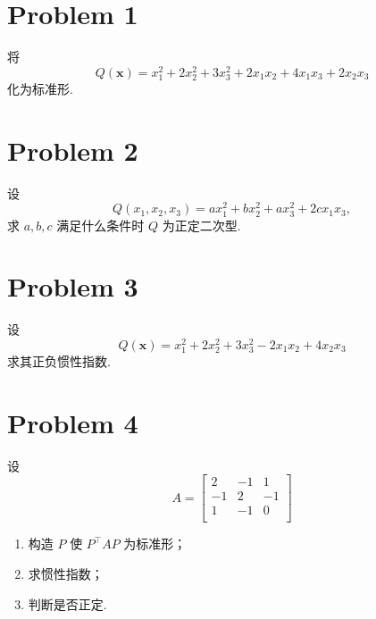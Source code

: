 \section*{Problem 1}

将
\[
Q\left(\boldsymbol{x}\right) = x_1^2 + 2x_2^2 + 3x_3^2 + 2x_1x_2 + 4x_1x_3 + 2x_2x_3
\]
化为标准形.

\section*{Problem 2}

设
\[
Q\left(x_1, x_2, x_3\right) = ax_1^2 + bx_2^2 + ax_3^2 + 2cx_1x_3,
\]
求 $a, b, c$ 满足什么条件时 $Q$ 为正定二次型.

\section*{Problem 3}

设
\[
Q \left(\boldsymbol{x}\right) = x_1^2 + 2x_2^2 + 3x_3^2 - 2x_1x_2 + 4x_2x_3
\]
求其正负惯性指数.

\section*{Problem 4}

设
\[
A =
\begin{bmatrix}
    2 & -1 & 1 \\
    -1 & 2 & -1 \\
    1 & -1 & 0 \\
\end{bmatrix}
\]
\begin{enumerate}
    \item 构造 $P$ 使 $P^\top A P$ 为标准形；
    \item 求惯性指数；
    \item 判断是否正定.
\end{enumerate}
